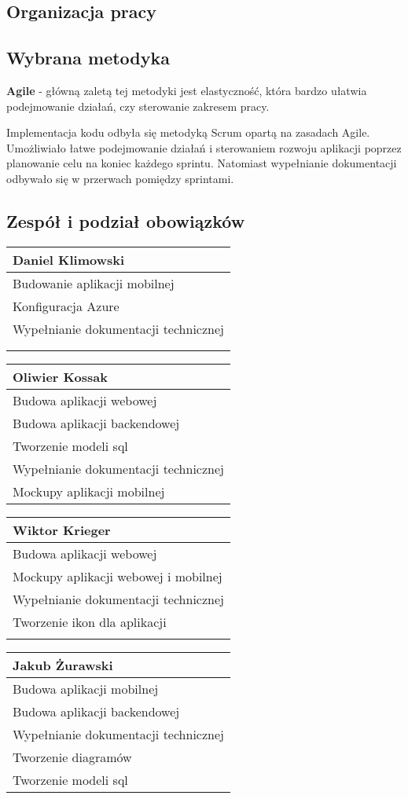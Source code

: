 \usepackage{xifthen}

\newcommand{\member}[6]{
    \textbf{#1} \\
    \hline #2 \\
    \hline #3 \\
    \hline #4
    \ifthenelse{{ \equal {#5} {} }}{}{\\ \hline #5}
    \ifthenelse{{ \equal {#6} {} }}{}{\\ \hline #6}
}

\newcommand{\membertable}[1]{
    \begin{tabularx}{1\textwidth}{|>{\centering\arraybackslash}X|}
        \hline
        #1
        \\
        \hline
    \end{tabularx}
    \vspace{2em}
}

\begin{chap5}
    \chapter{Organizacja pracy}

    \section{Wybrana metodyka}
    \par \textbf{Agile} - główną zaletą tej metodyki jest elastyczność, która bardzo ułatwia podejmowanie działań,
    czy sterowanie zakresem pracy.

    \par Implementacja kodu odbyła się metodyką Scrum opartą na zasadach Agile. Umożliwiało łatwe podejmowanie działań i sterowaniem
    rozwoju aplikacji poprzez planowanie celu na koniec każdego sprintu. Natomiast wypełnianie dokumentacji odbywało się w przerwach pomiędzy sprintami.

    \section{Zespół i podział obowiązków}
    \centering
    \membertable{\member{Daniel Klimowski}{Budowanie aplikacji mobilnej}{Konfiguracja Azure}{Wypełnianie dokumentacji technicznej}{}{}}

    \membertable{\member{Oliwier Kossak}{Budowa aplikacji webowej}{Budowa aplikacji backendowej}{Tworzenie modeli sql}{Wypełnianie dokumentacji technicznej}{Mockupy aplikacji mobilnej}}

    \membertable{\member{Wiktor Krieger}{Budowa aplikacji webowej}{Mockupy aplikacji webowej i mobilnej}{Wypełnianie dokumentacji technicznej}{Tworzenie ikon dla aplikacji}{}}

    \membertable{\member{Jakub Żurawski}{Budowa aplikacji mobilnej}{Budowa aplikacji backendowej}{Wypełnianie dokumentacji technicznej}{Tworzenie diagramów}{Tworzenie modeli sql}}
\end{chap5}